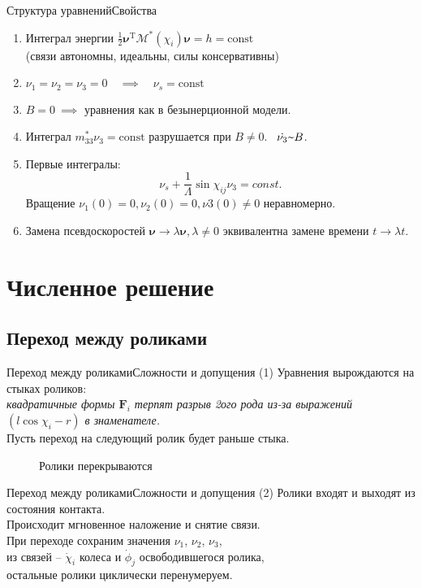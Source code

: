 \documentclass{beamer}
\newcommand\ddfrac[2]{\displaystyle\frac{\displaystyle #1}{\displaystyle #2}}
\newcommand\M[0]{\mathcal{M}} %
\newcommand{\textprop}{\raisebox{0.5ex}{\texttildelow}}
\renewcommand{\vec}[1]{\boldsymbol{\mathbf{#1}}}
\begin{document}
\begin{frame}{Структура уравнений}{Свойства}    
\begin{enumerate}
    \item Интеграл энергии \quad $\frac{1}{2}\vec{\nu}^\mathrm{T}\M^*(\chi_i)\vec{\nu} = h = \mathrm{const}$\\
    (связи автономны, идеальны, силы консервативны)
    \item $\nu_1 = \nu_2 = \nu_3 = 0 \quad \implies \quad \nu_s = \mathrm{const}$
    \item $B = 0 \ \implies$ уравнения как в безынерционной модели.
    \item Интеграл $m_{33}^*\nu_3 = \mathrm{const}$ разрушается при $B \neq 0$. \ $\dot{\nu_3} \textprop B$.
    \item Первые интегралы:
    $$\nu_s + \ddfrac{1}{\Lambda}\sin\chi_{ij}\nu_3 = const.$$
    Вращение $\nu_1(0) = 0, \nu_2(0) = 0, \nu3(0) \neq 0$ неравномерно.
    \item Замена псевдоскоростей $\vec{\nu} \rightarrow \lambda\vec{\nu}, \lambda \neq 0$ эквивалентна замене времени $t \rightarrow \lambda t$.
\end{enumerate}
\end{frame}

\section{Численное решение}

\subsection{Переход между роликами}

\begin{frame}{Переход между роликами}{Сложности и допущения}
    \textcolor{Periwinkle}{(1) Уравнения вырождаются на стыках роликов:}\\
    \textit{квадратичные формы $\boldsymbol{F}_i$ терпят разрыв 2ого рода из-за выражений $(l\cos\chi_i-r)$ в знаменателе.} \\
    Пусть переход на следующий ролик будет раньше стыка.
    \begin{figure}
        \centering
        \caption{Ролики перекрываются}
    \end{figure}
\end{frame}

\begin{frame}{Переход между роликами}{Сложности и допущения}
    \textcolor{Periwinkle}{(2) Ролики входят и выходят из состояния контакта.}\\
    Происходит мгновенное наложение и снятие связи.\\
    При переходе сохраним значения $\nu_1$, $\nu_2$, 
    $\nu_3$,\\
    из связей -- $\dot\chi_i$ колеса и $\dot\phi_j$ освободившегося ролика,\\
    остальные ролики циклически перенумеруем.
    \begin{figure}
        \centering
    \end{figure}
\end{frame}
\end{document}
